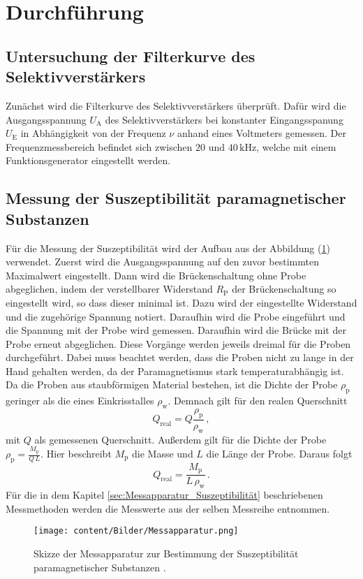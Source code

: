 \section{Durchführung}
\label{sec:Durchführung}
\subsection{Untersuchung der Filterkurve des Selektivverstärkers}
Zunächst wird die Filterkurve des Selektivverstärkers überprüft. Dafür wird die Ausgangsspannung $U_{\text{A}}$ des Selektivverstärkers bei 
konstanter Eingangsspanung $U_{\text{E}}$  in Abhängigkeit von der Frequenz $\nu$ anhand eines Voltmeters gemessen. Der Frequenzmessbereich befindet sich zwischen
$20$ und $40\,\unit{\kilo\hertz}$, welche mit einem Funktionsgenerator eingestellt werden.

\subsection{Messung der Suszeptibilität paramagnetischer Substanzen}
Für die Messung der Suszeptibilität wird der Aufbau aus der Abbildung (\ref{fig:Messapparatur}) verwendet. Zuerst wird die Ausgangsspannung
auf den zuvor bestimmten Maximalwert eingestellt. Dann wird die Brückenschaltung ohne Probe abgeglichen, indem der verstellbarer Widerstand $R_{\text{P}}$
der Brückenschaltung so eingestellt wird, so dass dieser minimal ist. Dazu wird der eingestellte Widerstand und die zugehörige Spannung notiert. Daraufhin 
wird die Probe eingeführt und die Spannung mit der Probe wird gemessen. Daraufhin wird die Brücke mit der Probe erneut abgeglichen. Diese Vorgänge werden jeweils
dreimal für die Proben durchgeführt. Dabei muss beachtet werden, dass die Proben nicht zu lange in der Hand gehalten werden, da der Paramagnetismus stark temperaturabhängig ist.
Da die Proben aus staubförmigen Material bestehen, ist die Dichte der Probe $\rho _{\text{p}}$ geringer als die eines Einkrisstalles $\rho _{\text{w}}$. Demnach gilt für den realen Querschnitt 
\begin{equation}
    Q_{\text{real}}= Q \frac{\rho_{\text{p}}}{\rho_{\text{w}}}\,,
    \label{eqn:Querschnitt}
\end{equation}
mit $Q$ als gemessenen Querschnitt. Außerdem gilt für die Dichte der Probe $\rho_{\text{p}} = \frac{M_{\text{p}}}{Q\, L}$. Hier beschreibt $M_{\text{p}}$  die Masse und
$L$ die Länge der Probe. Daraus folgt
\begin{equation}
    Q_{\text{real}}= \frac{M_{\text{p}}}{L\,\rho_{\text{w}}}\,.
    \label{eqn:Querschnitt_Real}
\end{equation}
Für die in dem Kapitel \ref{sec:Messapparatur_Suszeptibilität}
beschriebenen Messmethoden werden die Messwerte aus der selben Messreihe entnommen. 
\begin{figure}[H]
    \centering
    \texttt{[image: content/Bilder/Messapparatur.png]}
    \caption{Skizze der Messapparatur zur Bestimmung der Suszeptibilität paramagnetischer Substanzen \cite{anleitungV606}.}
    \label{fig:Messapparatur}
\end{figure} 